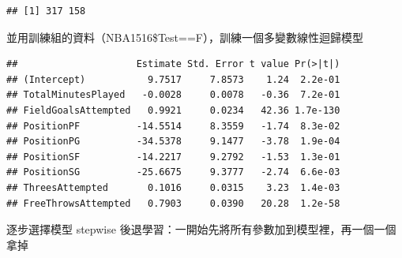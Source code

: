 \documentclass[
]{book}
\newenvironment{Shaded}{\begin{snugshade}}{\end{snugshade}}
\newcommand{\CommentTok}[1]{\textcolor[rgb]{0.56,0.35,0.01}{\textit{#1}}}
\newcommand{\DataTypeTok}[1]{\textcolor[rgb]{0.13,0.29,0.53}{#1}}
\newcommand{\KeywordTok}[1]{\textcolor[rgb]{0.13,0.29,0.53}{\textbf{#1}}}
\newcommand{\NormalTok}[1]{#1}
\newcommand{\OperatorTok}[1]{\textcolor[rgb]{0.81,0.36,0.00}{\textbf{#1}}}
\newcommand{\OtherTok}[1]{\textcolor[rgb]{0.56,0.35,0.01}{#1}}
\newcommand{\StringTok}[1]{\textcolor[rgb]{0.31,0.60,0.02}{#1}}
\begin{document}
\begin{verbatim}
## [1] 317 158
\end{verbatim}

並用訓練組的資料（NBA1516\$Test==F），訓練一個多變數線性迴歸模型

\begin{Shaded}
\end{Shaded}

\begin{verbatim}
##                     Estimate Std. Error t value Pr(>|t|)
## (Intercept)           9.7517     7.8573    1.24  2.2e-01
## TotalMinutesPlayed   -0.0028     0.0078   -0.36  7.2e-01
## FieldGoalsAttempted   0.9921     0.0234   42.36 1.7e-130
## PositionPF          -14.5514     8.3559   -1.74  8.3e-02
## PositionPG          -34.5378     9.1477   -3.78  1.9e-04
## PositionSF          -14.2217     9.2792   -1.53  1.3e-01
## PositionSG          -25.6675     9.3777   -2.74  6.6e-03
## ThreesAttempted       0.1016     0.0315    3.23  1.4e-03
## FreeThrowsAttempted   0.7903     0.0390   20.28  1.2e-58
\end{verbatim}

逐步選擇模型 stepwise 後退學習：一開始先將所有參數加到模型裡，再一個一個拿掉

\begin{Shaded}
\end{Shaded}
\end{document}
